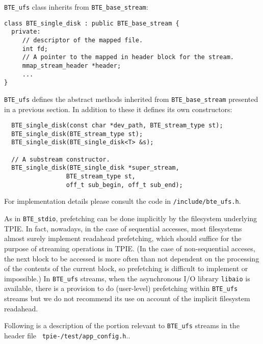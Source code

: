 \verb|BTE_ufs| class inherits from \verb|BTE_base_stream|:
\begin{verbatim}
class BTE_single_disk : public BTE_base_stream {
  private:
     // descriptor of the mapped file.  
     int fd;   
     // A pointer to the mapped in header block for the stream. 
     mmap_stream_header *header;
     ...
}  
\end{verbatim}

\verb|BTE_ufs| defines the abstract methods inherited from
\verb|BTE_base_stream| presented in a previous section. In addition to
these it defines its own constructors:
\begin{verbatim}
  BTE_single_disk(const char *dev_path, BTE_stream_type st); 
  BTE_single_disk(BTE_stream_type st); 
  BTE_single_disk(BTE_single_disk<T> &s); 
  
  // A substream constructor.
  BTE_single_disk(BTE_single_disk *super_stream,
                 BTE_stream_type st,
                 off_t sub_begin, off_t sub_end);
\end{verbatim}

For implementation details please consult the code in
\verb|/include/bte_ufs.h|.

As in  \verb|BTE_stdio|, prefetching can be done implicitly by the
filesystem underlying TPIE. In fact, nowadays, in the case of 
sequential accesses, most filesystems almost surely implement
readahead prefetching, which should suffice for the purpose of
streaming operations in TPIE. (In the case of non-sequential acceses,
the next block to be accessed is more often than not dependent on
the processing of the contents of the current block, so prefetching
is difficult to implement or impossible.) In \verb|BTE_ufs|
streams, when the asynchronous I/O library {\tt libaio} is available, there is a provision
to do (user-level) prefetching within \verb|BTE_ufs| streams but we
do not recommend its use on account of the implicit filesystem readahead.


Following is a description of the portion relevant to  \verb|BTE_ufs|
streams in  the header file {\tt
tpie-\version/test/app\_config.h}..


